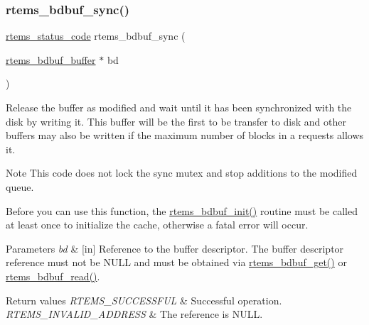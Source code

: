 \subsubsection{\texorpdfstring{rtems\_bdbuf\_sync()}{rtems\_bdbuf\_sync()}}
{\footnotesize\ttfamily \mbox{\hyperlink{group__ClassicStatus_ga545d41846817eaba6143d52ee4d9e9fe}{rtems\+\_\+status\+\_\+code}} rtems\+\_\+bdbuf\+\_\+sync (\begin{DoxyParamCaption}\item[{\mbox{\hyperlink{structrtems__bdbuf__buffer}{rtems\+\_\+bdbuf\+\_\+buffer}} $\ast$}]{bd }\end{DoxyParamCaption})}

Release the buffer as modified and wait until it has been synchronized with the disk by writing it. This buffer will be the first to be transfer to disk and other buffers may also be written if the maximum number of blocks in a requests allows it.

\begin{DoxyNote}{Note}
This code does not lock the sync mutex and stop additions to the modified queue.
\end{DoxyNote}
Before you can use this function, the \mbox{\hyperlink{group__rtems__bdbuf_gaf19ee8ba7815e24767b6a91e200a78bc}{rtems\+\_\+bdbuf\+\_\+init()}} routine must be called at least once to initialize the cache, otherwise a fatal error will occur.


\begin{DoxyParams}{Parameters}
{\em bd} & \mbox{[}in\mbox{]} Reference to the buffer descriptor. The buffer descriptor reference must not be {\ttfamily N\+U\+LL} and must be obtained via \mbox{\hyperlink{group__rtems__bdbuf_ga05fa34cc25ade6d09797b0dc88cf33e1}{rtems\+\_\+bdbuf\+\_\+get()}} or \mbox{\hyperlink{group__rtems__bdbuf_ga8546cefc842eef10cdb5b38a6cead9f7}{rtems\+\_\+bdbuf\+\_\+read()}}.\\
\hline
\end{DoxyParams}

\begin{DoxyRetVals}{Return values}
{\em R\+T\+E\+M\+S\+\_\+\+S\+U\+C\+C\+E\+S\+S\+F\+UL} & Successful operation. \\
\hline
{\em R\+T\+E\+M\+S\+\_\+\+I\+N\+V\+A\+L\+I\+D\+\_\+\+A\+D\+D\+R\+E\+SS} & The reference is N\+U\+LL. \\
\hline
\end{DoxyRetVals}
\mbox{\label{group__rtems__bdbuf_ga1f02deb0d0ca33a6b9da04b9f3f2078d}} 

